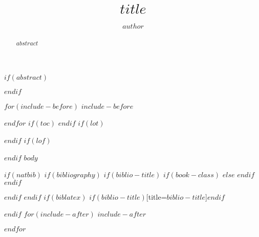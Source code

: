 \documentclass{article}
\title{$title$}
\author{$author$}
\begin{document}
\maketitle
$if(abstract)$
\begin{abstract}
$abstract$
\end{abstract}
$endif$

$for(include-before)$
$include-before$

$endfor$
$if(toc)$
{
\hypersetup{linkcolor=$if(toccolor)$$toccolor$$else$black$endif$}
\setcounter{tocdepth}{$toc-depth$}
\tableofcontents
}
$endif$
$if(lot)$
\listoftables
$endif$
$if(lof)$
\listoffigures
$endif$
$body$

$if(natbib)$
$if(bibliography)$
$if(biblio-title)$
$if(book-class)$
\renewcommand\bibname{$biblio-title$}
$else$
\renewcommand\refname{$biblio-title$}
$endif$
$endif$


$endif$
$endif$
$if(biblatex)$
\printbibliography$if(biblio-title)$[title=$biblio-title$]$endif$

$endif$
$for(include-after)$
$include-after$

$endfor$
\end{document}
